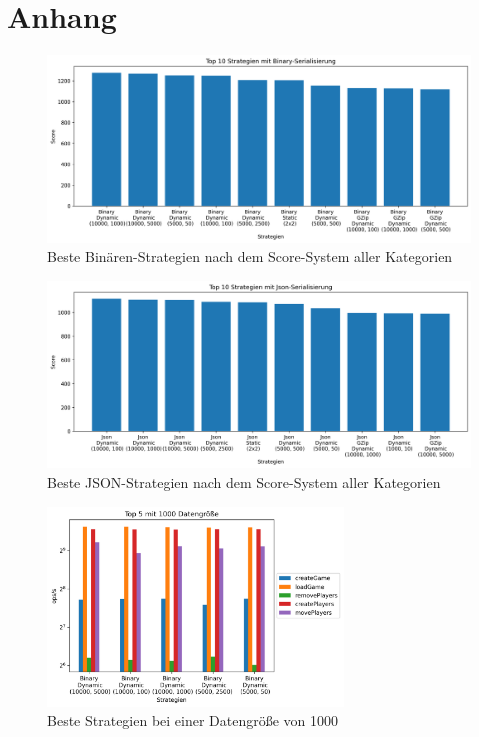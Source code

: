 \chapter{Anhang}\label{ch:appendix}

\begin{figure}[htp]
    \centering
    \includegraphics[width=1\textwidth]{images/plots/Binary.png}
    \caption{Beste Binären-Strategien nach dem Score-System aller Kategorien}
    \label{fig:topStratBin}
\end{figure}

\begin{figure}[htp]
    \centering
    \includegraphics[width=1\textwidth]{images/plots/Json.png}
    \caption{Beste JSON-Strategien nach dem Score-System aller Kategorien}
    \label{fig:topStratJson}
\end{figure}

\begin{figure}[htp]
    \centering
    \includegraphics[width=0.7\textwidth]{images/plots/1000.png}
    \caption{Beste Strategien bei einer Datengröße von 1000}
    \label{fig:smallDataCount}
\end{figure}

